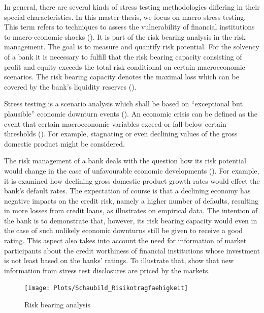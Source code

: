 \documentclass[a4paper, 11pt]{scrreprt}
\begin{document}
In general, there are several kinds of stress testing methodologies differing in their special characteristics. In this master thesis, we focus on macro stress testing.
This term refers to techniques to assess the vulnerability of financial institutions to macro-economic shocks (\textcite{imf2001stresstesting}).
It is part of the risk bearing analysis in the risk management. 
The goal is to measure and quantify risk potential. 
For the solvency of a bank it is necessary to fulfill that the risk bearing capacity consisting of profit and equity exceeds the total risk conditional on certain macroeconomic scenarios. The risk bearing capacity denotes the maximal loss which can be covered by the bank's liquidity reserves (\textcite{buba2017icaap}).

Stress testing is a scenario analysis which shall be based on ``exceptional but plausible'' \linebreak economic downturn events (\textcite[guideline 10]{ecb2010cebs}). 
An economic crisis can be defined as the event that certain macroeconomic variables exceed or fall below certain thresholds (\textcite[chapter 1]{bis2004sorge}).
For example, stagnating or even declining values of the gross domestic product might be considered. 

\bigskip 

The risk management of a bank deals with the question how its risk potential would change in the case of unfavourable economic developments (\textcite[MaRisk AT 4.3.3, note 3]{bafin2017marisk}).
For example, it is examined how declining gross domestic product growth rates would effect the bank's default rates. The expectation of course is that a declining economy has negative impacts on the credit risk, namely a higher number of defaults, resulting in more losses from credit loans, as \textcite[p. 112]{wilson1997wilsonI} illustrates on empirical data.
The intention of the bank is to demonstrate that, however, its risk bearing capacity would even in the case of such unlikely economic downturns still be given to receive a good rating. 
This aspect also takes into account the need for information of market participants about the credit worthiness of financial institutions whose investment is not least based on the banks' ratings. To illustrate that, \textcite[p. 5]{gross2017dostresstestsmatter} show that new information from stress test disclosures are priced by the markets.

\begin{figure}[H]
	\centering
	\texttt{[image: Plots/Schaubild\_Risikotragfaehigkeit]}
	\caption{Risk bearing analysis}
	\label{image:riskbearinganalysis}
\end{figure}
\end{document}
